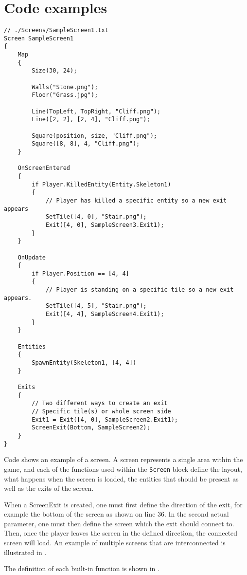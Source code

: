 \section{Code examples}

\begin{lstlisting}[caption={Example screen.}, label={lst:SampleScreen1},escapechar=|]
// ./Screens/SampleScreen1.txt
Screen SampleScreen1 
{
    Map 
    {
        Size(30, 24);

        Walls("Stone.png"); 
        Floor("Grass.jpg");

        Line(TopLeft, TopRight, "Cliff.png");
        Line([2, 2], [2, 4], "Cliff.png");

        Square(position, size, "Cliff.png");
        Square([8, 8], 4, "Cliff.png");
    }

    OnScreenEntered
    {
        if Player.KilledEntity(Entity.Skeleton1) 
        {
            // Player has killed a specific entity so a new exit appears
            SetTile([4, 0], "Stair.png");
            Exit([4, 0], SampleScreen3.Exit1);
        }
    }

    OnUpdate
    {
        if Player.Position == [4, 4] 
        {
            // Player is standing on a specific tile so a new exit appears.
            SetTile([4, 5], "Stair.png");
            Exit([4, 4], SampleScreen4.Exit1);
        }
    }

    Entities
    {
        SpawnEntity(Skeleton1, [4, 4])
    }
    
    Exits 
    {
        // Two different ways to create an exit
        // Specific tile(s) or whole screen side
        Exit1 = Exit([4, 0], SampleScreen2.Exit1);
        ScreenExit(Bottom, SampleScreen2);
    }
}
\end{lstlisting}

Code  shows an example of a screen. A screen represents a single area within the game, and each of the functions used within the \texttt{Screen} block define the layout, what happens when the screen is loaded, the entities that should be present as well as the exits of the screen. 

When a ScreenExit is created, one must first define the direction of the exit, for example the bottom of the screen as shown on line 36.
In the second actual parameter, one must then define the screen which the exit should connect to.
Then, once the player leaves the screen in the defined direction, the connected screen will load. An example of multiple screens that are interconnected is illustrated in .


The definition of each built-in function is shown in .